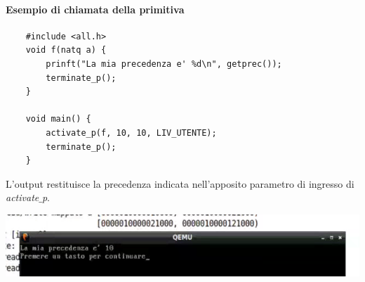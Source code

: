 \paragraph{Esempio di chiamata della primitiva}
\begin{verbatim}
	#include <all.h>
	void f(natq a) {
		prinft("La mia precedenza e' %d\n", getprec());
		terminate_p();
	}
	
	void main() {
		activate_p(f, 10, 10, LIV_UTENTE);
		terminate_p();
	}
\end{verbatim}
L'output restituisce la precedenza indicata nell'apposito parametro di ingresso di \emph{activate$\_$p}.
\begin{center}\includegraphics[scale=.95]{img/191.PNG}\end{center}